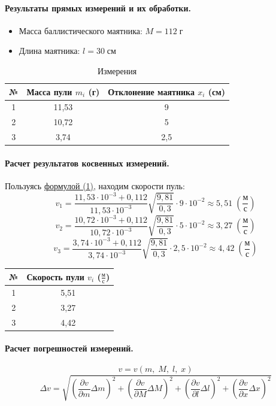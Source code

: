\documentclass{article}
\begin{document}
\paragraph{Результаты прямых измерений и их обработки.}
\begin{itemize}
	\item Масса баллистического маятника: $ M=112\;\mbox{г} $ 
	\item Длина маятника: $ l=30\;\mbox{см}$
\end{itemize}
		
		\begin{table}[htb]
			\centering
		\caption{Измерения}
		\begin{tabular}{| c | c | c |}
			\hline
			№ & Масса пули $m_i$ (г) & Отклонение маятника $x_i$ (см) \\
			\hline
			1 & 11,53 & 9 \\
			\hline
			2 & 10,72 & 5 \\
			\hline
			3 & 3,74 & 2,5 \\
			\hline
		\end{tabular}
	\end{table}

\paragraph{Расчет результатов косвенных измерений.}
Пользуясь \hyperlink{formuls}{формулой (1)}, находим скорости пуль:
$$ v_1=\frac{11,53\cdot10^{-3}+0,112}{11,53\cdot10^{-3}}\sqrt{\frac{9,81}{0,3}}\cdot9\cdot10^{-2}\approx5,51\;\left( \frac{\mbox{м}}{\mbox{с}}\right)
 $$
 $$ v_2=\frac{10,72\cdot10^{-3}+0,112}{10,72\cdot10^{-3}}\sqrt{\frac{9,81}{0,3}}\cdot5\cdot10^{-2}\approx3,27\;\left( \frac{\mbox{м}}{\mbox{с}}\right)
 $$
 $$ v_3=\frac{3,74\cdot10^{-3}+0,112}{3,74\cdot10^{-3}}\sqrt{\frac{9,81}{0,3}}\cdot2,5\cdot10^{-2}\approx4,42\;\left( \frac{\mbox{м}}{\mbox{с}}\right)
 $$
\begin{table}[!htb]
	\centering
	
	\begin{tabular}{|c|c|}
		\hline
		№ & Скорость пули $v_i$ ($\frac{\mbox{м}}{\mbox{с}}$) \\
		\hline
		1 &  5,51  \\
		\hline
		2 &  3,27  \\
		\hline
		3 & 4,42  \\
		\hline
	\end{tabular}
\end{table}

\paragraph{Расчет погрешностей измерений.}
$$ v=v(m,\;M,\;l,\;x)$$
$$ 
\Delta v=\sqrt{\left(\frac{\partial v}{\partial m}\Delta m\right)^2 + \left(\frac{\partial v}{\partial M}\Delta M\right)^2 + \left(\frac{\partial v}{\partial l}\Delta l\right)^2 + \left(\frac{\partial v}{\partial x}\Delta x\right)^2}
$$
\end{document}
